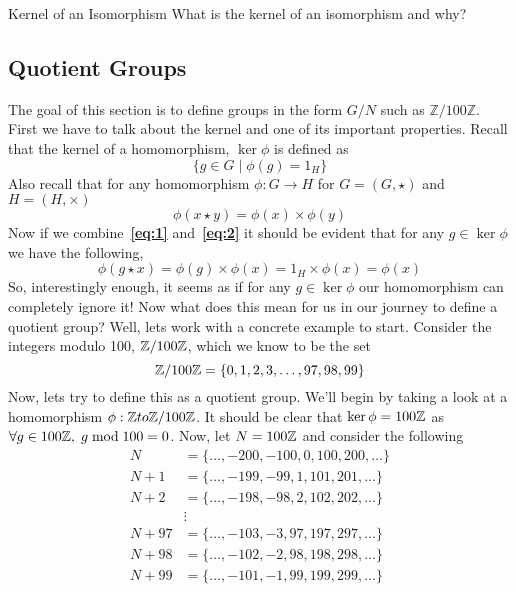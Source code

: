 \begin{question}{Kernel of an Isomorphism}{}
    What is the kernel of an isomorphism and why?
\end{question}

\subsection{Quotient Groups}
The goal of this section is to define groups in the form $G/N$ such as $\mathbb{Z}/100\mathbb{Z}$. First we have to talk about the kernel and one of its important properties. Recall that the kernel of a homomorphism, $\ker \phi$ is defined as 
\begin{equation} \label{eq:1}
    \{g \in G \mid \phi(g) = 1_H\} 
\end{equation}
Also recall that for any homomorphism $\phi: G \to H$ for $G = (G, \star)$ and $H = (H, \times)$
\begin{equation} \label{eq:2}
    \phi(x \star y) = \phi(x) \times \phi(y)
\end{equation}
Now if we combine~\textbf{\ref{eq:1}} and~\textbf{\ref{eq:2}} it should be evident that for any $g \in \ker\phi$ we have the following, 
\begin{equation} \label{eq:3}
    \phi(g \star x) = \phi(g) \times \phi(x) = 1_H \times \phi(x) = \phi(x)
\end{equation}
So, interestingly enough, it seems as if for any $g \in \ker \phi$ our homomorphism can completely ignore it! Now what does this mean for us in our journey to define a quotient group? Well, lets work with a concrete example to start. Consider the integers modulo 100, $\mathbb Z/100\mathbb Z$, which we know to be the set
\begin{equation}
    \mathbb Z/100\mathbb Z = \{0, 1, 2, 3, \dots, 97, 98, 99\}
\end{equation}
Now, lets try to define this as a quotient group. We'll begin by taking a look at a homomorphism $\phi: \mathbb Z to \mathbb Z/100\mathbb Z$. It should be clear that $\ker \phi = 100\mathbb Z$ as $\forall g \in 100\mathbb Z, \hspace{0.1cm} g \bmod 100 = 0$. Now, let $N = 100\mathbb Z$ and consider the following
\begin{align*}
    N &= \{\dots, -200, -100, 0, 100, 200, \dots\} \\
    N + 1 &= \{\dots, -199, -99, 1, 101, 201, \dots\} \\
    N + 2 &= \{\dots, -198, -98, 2, 102, 202, \dots\} \\
    &\vdots  \\
    N + 97 &= \{\dots, -103, -3, 97, 197, 297, \dots\} \\
    N + 98 &= \{\dots, -102, -2, 98, 198, 298, \dots\} \\
    N + 99 &= \{\dots, -101, -1, 99, 199, 299, \dots\} \\
\end{align*}

